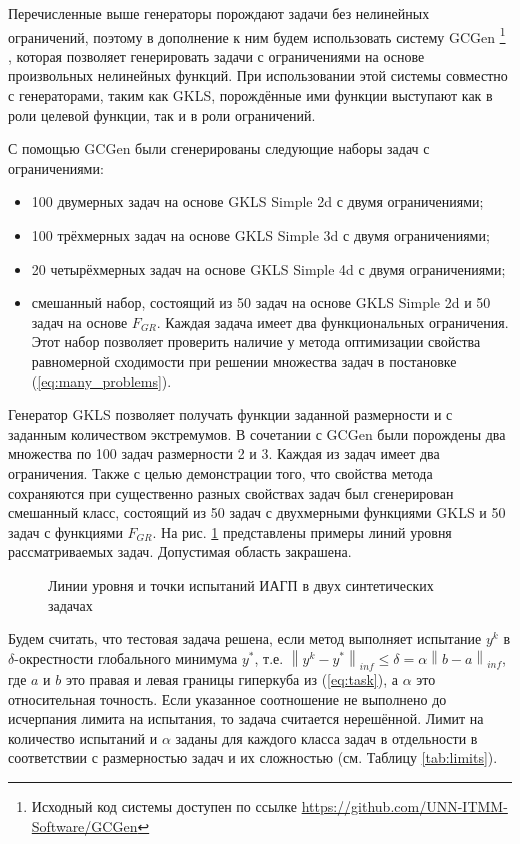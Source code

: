 Перечисленные выше генераторы порождают задачи без нелинейных ограничений, поэтому в дополнение к ним будем использовать
систему GCGen \footnote{Исходный код системы доступен по ссылке \url{https://github.com/UNN-ITMM-Software/GCGen}}
\cite{GergelBarkalov2019}, которая позволяет генерировать задачи с ограничениями на основе произвольных нелинейных
функций. При использовании этой системы совместно с генераторами, таким как GKLS, порождённые ими функции выступают как
в роли целевой функции, так и в роли ограничений.

С помощью GCGen были сгенерированы следующие наборы задач с ограничениями:
\begin{itemize}
  \item 100 двумерных задач на основе GKLS Simple 2d с двумя ограничениями;
  \item 100 трёхмерных задач на основе GKLS Simple 3d с двумя ограничениями;
  \item 20 четырёхмерных задач на основе GKLS Simple 4d с двумя ограничениями;
  \item смешанный набор, состоящий из 50 задач на основе GKLS Simple 2d и 50 задач на основе \(F_{GR}\).
  Каждая задача имеет два функциональных ограничения. Этот набор позволяет проверить наличие у метода оптимизации
  свойства равномерной сходимости при решении множества задач в постановке (\ref{eq:many_problems}).
\end{itemize}

Генератор GKLS \cite{Gaviano2003} позволяет получать функции заданной размерности и с заданным количеством экстремумов.
В сочетании с GCGen были порождены два множества по 100 задач размерности 2 и 3. Каждая из задач имеет два ограничения.
Также с целью демонстрации того, что свойства метода сохраняются при существенно разных свойствах задач
был сгенерирован смешанный класс, состоящий из 50 задач с двухмерными функциями GKLS и 50 задач с функциями \(F_{GR}\).
На рис. \ref{fig:isolines} представлены примеры линий уровня рассматриваемых задач. Допустимая область закрашена.

\begin{figure}[ht]
    \centering
    \caption{Линии уровня и точки испытаний ИАГП в двух синтетических задачах}
    \label{fig:isolines}
\end{figure}


Будем считать, что тестовая задача решена, если метод выполняет испытание
\(y^k\) в \(\delta\)-окрестности глобального минимума \(y^*\), т.е. $\left\|y^k-y^*\right\|_{inf}\leq \delta
= \alpha\left\|b-a\right\|_{inf}$, где \(a\) и \(b\) это правая и левая границы гиперкуба из (\ref{eq:task}),
а $\alpha$ это относительная точность. Если указанное соотношение не выполнено до исчерпания лимита на
испытания, то задача считается нерешённой. Лимит на количество испытаний и $\alpha$ заданы для каждого класса задач в отдельности
в соответствии с размерностью задач и их сложностью (см. Таблицу \ref{tab:limits}).

